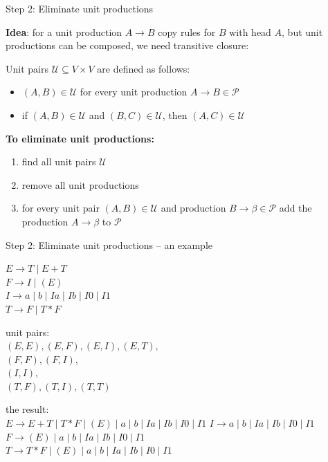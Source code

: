 \documentclass[handout]{beamer}
\begin{document}
\begin{frame}{Step 2: Eliminate unit productions}

	\textbf{Idea}: for a unit production $A\to B$ copy rules for $B$ with head $A$, but unit productions can be composed, we need transitive closure:

	\alert{Unit pairs} $\mathcal U\subseteq V\times V$ are defined as follows:
	\begin{itemize}
		\item $(A,B)\in\mathcal U$ for every unit production $A\to B\in\mathcal P$
		\item if $(A,B)\in\mathcal U$ and $(B,C)\in\mathcal U$, then $(A,C)\in\mathcal U$
	\end{itemize}

	\textbf{To eliminate unit productions:} 
	\begin{enumerate}
		\item find all unit pairs $\mathcal U$
		\item remove all unit productions
		\item for every unit pair $(A,B)\in\mathcal U$ and production $B\to\mathcal\beta\in\mathcal P$ add the production $A\to\beta$ to $\mathcal P$
	\end{enumerate}

\end{frame}
	

\begin{frame}{Step 2: Eliminate unit productions -- an example}

	$E\rightarrow T\mid E+T$\\
	$F\rightarrow I\mid (E)$\\
	$I\rightarrow a\mid b\mid Ia\mid Ib\mid I0\mid I1$\\
	$T\rightarrow F\mid T*F$

	unit pairs:\\		
	$(E,E),(E,F),(E,I),(E,T),$\\
	$(F,F),(F,I),$\\
	$(I,I),$\\
	$(T,F),(T,I),(T,T)$

	the result:\\
	$E\rightarrow E+T\mid T*F\mid (E)\mid a\mid b\mid Ia\mid Ib\mid I0\mid I1$
	$I\rightarrow a\mid b\mid Ia\mid Ib\mid I0\mid I1$\\
	$F\rightarrow (E)\mid a\mid b\mid Ia\mid Ib\mid I0\mid I1$\\
	$T\rightarrow T*F\mid (E)\mid a\mid b\mid Ia\mid Ib\mid I0\mid I1$\\
	

\end{frame}
\end{document}
